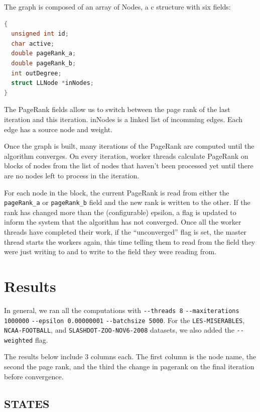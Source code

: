 \documentclass{report}
\newcommand{\results}[1]{{\ttfamily \begin{longtabu}{rll}
                           
                         \end{longtabu}\clearpage}}
\newcommand{\pagerank}{PageRank }
\begin{document}
The graph is composed of an array of Nodes, a c structure with six fields:
\begin{lstlisting}[language=C]
{
  unsigned int id;
  char active;
  double pageRank_a;
  double pageRank_b;
  int outDegree;
  struct LLNode *inNodes;
}
\end{lstlisting}

The \pagerank fields allow us to switch between the page rank of the last
iteration and this iteration. inNodes is a linked list of incomming edges. Each
edge has a source node and weight.

Once the graph is built, many iterations of the \pagerank are computed until the
algorithm converges. On every iteration, worker threads calculate \pagerank
on blocks of nodes from the list of nodes that haven't been processed yet until
there are no nodes left to process in the iteration.

For each node in the block, the current \pagerank is read from either the
\texttt{pageRank\_a} or \texttt{pageRank\_b} field and the new rank is written
to the other. If the rank has changed more than the (configurable) epsilon, a
flag is updated to inform the system that the algorithm has not converged. Once
all the worker threads have completed their work, if the ``unconverged'' flag is
set, the master thread starts the workers again, this time telling them to read
from the field they were just writing to and to write to the field they were
reading from.

\section{Results}
In general, we ran all the computations with \verb+--threads 8+
\verb+--maxiterations 1000000+ \verb+--epsilon 0.00000001+
\verb+--batchsize 5000+. For the \verb+LES-MISERABLES+, \verb+NCAA-FOOTBALL+, and
\verb+SLASHDOT-ZOO-NOV6-2008+ datasets, we also added the \verb+--weighted+
flag.

The results below include 3 columns each. The first column is the node name, the second the page rank, and the third the change in pagerank on the final iteration before convergence.

\subsection{STATES}
\results{stateborders-results.tex}
\end{document}
